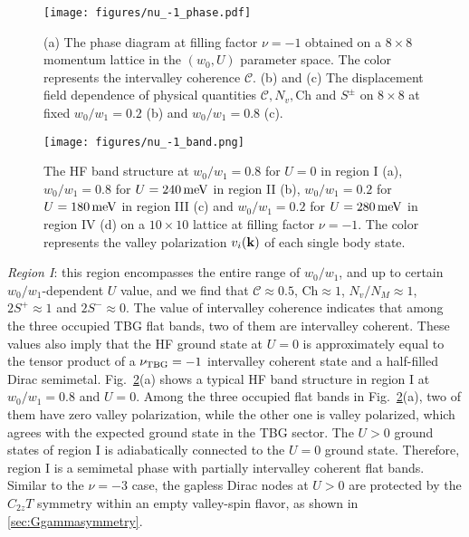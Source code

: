\documentclass[prb,aps,nofootinbib,amssymb,twocolumn,superscriptaddress,10pt]{revtex4-2}
\begin{document}
\begin{figure*}[!htbp]
	\centering
	\texttt{[image: figures/nu\_-1\_phase.pdf]}
	\caption{(a) The phase diagram at filling factor $\nu=-1$ obtained on a $8\times 8$ momentum lattice in the $(w_0, U)$ parameter space. The color represents the intervalley coherence $\mathcal{C}$. (b) and (c) The displacement field dependence of physical quantities $\mathcal{C}, N_v, \mathrm{Ch}$ and $S^\pm$ on $8\times 8$ at fixed $w_0/w_1 = 0.2$ (b) and $w_0/w_1 = 0.8$ (c).}
	\label{fig:nu_-1_phase}
\end{figure*}

\begin{figure*}[!htbp]
	\centering
	\texttt{[image: figures/nu\_-1\_band.png]}
	\caption{The HF band structure at $w_0/w_1 = 0.8$ for $U = 0$ in region I (a), $w_0/w_1 = 0.8$ for $U=240\rm\,meV$ in region II (b), $w_0/w_1 = 0.2$ for $U=180\rm\,meV$ in region III (c) and $w_0/w_1 = 0.2$ for $U = 280\,\rm meV$ in region IV (d) on a $10\times 10$ lattice at filling factor $\nu=-1$.  The color represents the valley polarization $v_i(\mathbf{k})$ of each single body state.}
	\label{fig:nu_-1_band}
\end{figure*}

{\it Region I}: this region encompasses the entire range of $w_0/w_1$, and up to certain $w_0/w_1$-dependent $U$ value, and we find that $\mathcal{C} \approx 0.5$, $\mathrm{Ch}\approx 1$, $N_v/N_M \approx 1$, $2S^+ \approx 1$ and $2S^- \approx 0$. The value of intervalley coherence indicates that among the three occupied TBG flat bands, two of them are intervalley coherent. These values also imply that the HF ground state at $U = 0$ is approximately equal to the tensor product of a $\nu_{\rm TBG} = -1$ intervalley coherent state \cite{ZHA20,LIA20} and a half-filled Dirac semimetal. Fig.~\ref{fig:nu_-1_band}(a) shows a typical HF band structure in region I at $w_0/w_1 = 0.8$ and $U = 0$. Among the three occupied flat bands in Fig.~\ref{fig:nu_-1_band}(a), two of them have zero valley polarization, while the other one is valley polarized, which agrees with the expected ground state in the TBG sector. The $U>0$ ground states of region I is adiabatically connected to the $U=0$ ground state. Therefore, region I is a semimetal phase with partially intervalley coherent flat bands. Similar to the $\nu=-3$ case, the gapless Dirac nodes at $U>0$ are protected by the $C_{2z}T$ symmetry within an empty valley-spin flavor, as shown in \ref{sec:Ggammasymmetry}.
\end{document}
